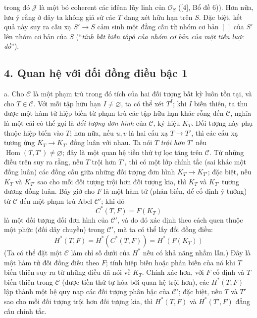 trong đó $\mathcal J$ là một bó coherent các iđêan lũy linh của $\mathcal O_S$
([4], Bổ đề 6)). Hơn nữa, lưu ý rằng ở đây ta không giả sử các $T$ đang xét hữu
hạn trên $S$. Đặc biệt, kết quả này suy ra cấu xạ $S'\longrightarrow S$ cảm
sinh một đẳng cấu từ nhóm cơ bản $[\,]$ của $S'$ lên nhóm cơ bản của $S$
(``\emph{tính bất biến tôpô của nhóm cơ bản của một tiền lược đồ}'').

\subsection*{4. Quan hệ với đối đồng điều bậc 1}

\medskip\noindent
a. Cho $\mathcal C$ là một phạm trù trong đó tích của hai đối tượng bất kỳ luôn
tồn tại, và cho $T\in\mathcal C$. Với mỗi tập hữu hạn
$I\ne\varnothing$, ta có thể xét $T^I$; khi $I$ biến thiên, ta thu được một hàm
tử hiệp biến từ phạm trù các tập hữu hạn khác rỗng đến $\mathcal C$, nghĩa là
một cái có thể gọi là \emph{đối tượng đơn hình} của $\mathcal C$, ký hiệu
$K_T$. Đối tượng này phụ thuộc hiệp biến vào $T$; hơn nữa, nếu $u,v$ là hai
cấu xạ $T\longrightarrow T'$, thì các cấu xạ tương ứng
$K_T\longrightarrow K_{T'}$ đồng luân với nhau. Ta nói $T$
\emph{trội hơn} $T'$ nếu $\operatorname{Hom}(T,T')\ne\varnothing$; đây là một
quan hệ tiền thứ tự lọc tăng trên $\mathcal C$. Từ những điều trên suy ra rằng,
nếu $T$ trội hơn $T'$, thì có một lớp chính tắc (sai khác một đồng luân) các
đồng cấu giữa những đối tượng đơn hình $K_T\longrightarrow K_{T'}$; đặc biệt,
nếu $K_T$ và $K_{T'}$ sao cho mỗi đối tượng trội hơn đối tượng kia, thì $K_T$
và $K_{T'}$ tương đương đồng luân. Bây giờ cho $F$ là một hàm tử (phản biến,
để cố định ý tưởng) từ $\mathcal C$ đến một phạm trù Abel $\mathcal C'$; khi đó
\[
  C^*(T,F)=F(K_T)
\]
là một đối tượng đối đơn hình của $\mathcal C'$, và do đó xác định theo cách
quen thuộc một phức (đối dây chuyền) trong $\mathcal C'$, mà ta có thể lấy đối
đồng điều:
\[
  H^*(T,F)=H^*(C^*(T,F))=H^*(F(K_T))
\]
(Ta có thể đặt một $\mathcal C$ làm chỉ số dưới của $H^*$ nếu có khả năng nhầm
lẫn.) Đây là một hàm tử đối đồng điều theo $F$; tính hiệp biến hoặc phản biến
của nó khi $T$ biến thiên suy ra từ những điều đã nói về $K_T$. Chính xác hơn,
với $F$ cố định và $T$ biến thiên trong $\mathcal C$ (được tiền thứ tự hóa bởi
quan hệ trội hơn), các $H^*(T,F)$ lập thành một hệ quy nạp các đối tượng phân
bậc của $\mathcal C'$; đặc biệt, nếu $T$ và $T'$ sao cho mỗi đối tượng trội hơn
đối tượng kia, thì $H^*(T,F)$ và $H^*(T',F)$ đẳng cấu chính tắc.

